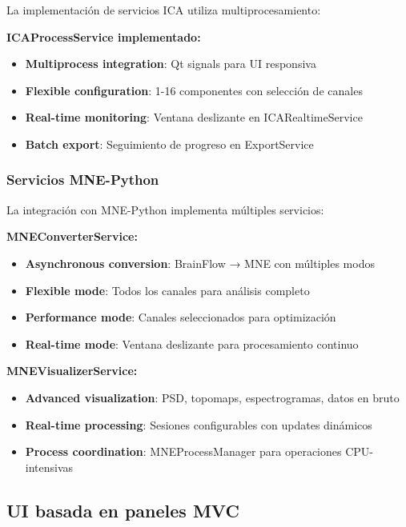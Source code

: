 La implementación de servicios ICA utiliza multiprocesamiento:

\textbf{ICAProcessService implementado:}
\begin{itemize}
    \item \textbf{Multiprocess integration}: Qt signals para UI responsiva
    \item \textbf{Flexible configuration}: 1-16 componentes con selección de canales
    \item \textbf{Real-time monitoring}: Ventana deslizante en ICARealtimeService
    \item \textbf{Batch export}: Seguimiento de progreso en ExportService
\end{itemize}

\subsubsection{Servicios MNE-Python}

La integración con MNE-Python implementa múltiples servicios:

\textbf{MNEConverterService:}
\begin{itemize}
    \item \textbf{Asynchronous conversion}: BrainFlow → MNE con múltiples modos
    \item \textbf{Flexible mode}: Todos los canales para análisis completo
    \item \textbf{Performance mode}: Canales seleccionados para optimización
    \item \textbf{Real-time mode}: Ventana deslizante para procesamiento continuo
\end{itemize}

\textbf{MNEVisualizerService:}
\begin{itemize}
    \item \textbf{Advanced visualization}: PSD, topomaps, espectrogramas, datos en bruto
    \item \textbf{Real-time processing}: Sesiones configurables con updates dinámicos
    \item \textbf{Process coordination}: MNEProcessManager para operaciones CPU-intensivas
\end{itemize}

\subsection{UI basada en paneles MVC}
\label{subsec:ui_paneles_mvc}


